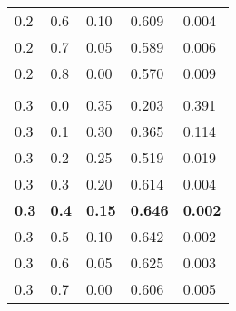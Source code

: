 \documentclass{article}
\begin{document}
\begin{table}[h!]
\begin{tabular}{lllll}
	0.2 & 0.6 & 0.10 & 0.609 & 0.004 \\
	0.2 & 0.7 & 0.05 & 0.589 & 0.006 \\
	0.2 & 0.8 & 0.00 & 0.570 & 0.009 \\
		&&&& \\
	0.3 & 0.0 & 0.35 & 0.203 & 0.391 \\
	0.3 & 0.1 & 0.30 & 0.365 & 0.114 \\
	0.3 & 0.2 & 0.25 & 0.519 & 0.019 \\
	0.3 & 0.3 & 0.20 & 0.614 & 0.004 \\
	\textbf{0.3} & \textbf{0.4} & \textbf{0.15} & \textbf{0.646} & \textbf{0.002} \\
	0.3 & 0.5 & 0.10 & 0.642 & 0.002 \\
	0.3 & 0.6 & 0.05 & 0.625 & 0.003 \\
	0.3 & 0.7 & 0.00 & 0.606 & 0.005 \\
	\bottomrule
\end{tabular}
\label{table:gammaresults1}
\end{table}
\end{document}
